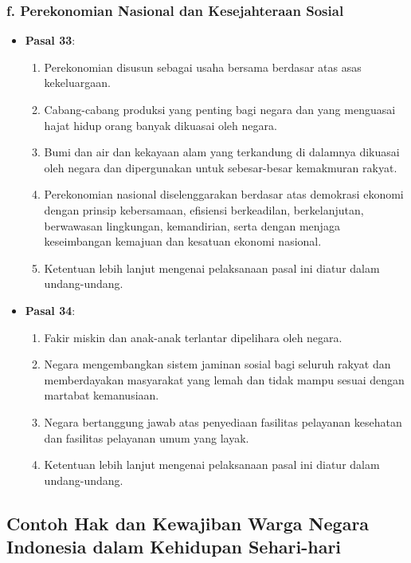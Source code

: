 \subsubsection{f. Perekonomian Nasional dan Kesejahteraan Sosial}
\begin{itemize}
    \item \textbf{Pasal 33}:
    \begin{enumerate}
        \item Perekonomian disusun sebagai usaha bersama berdasar atas asas kekeluargaan.
        \item Cabang-cabang produksi yang penting bagi negara dan yang menguasai hajat hidup orang banyak dikuasai oleh negara.
        \item Bumi dan air dan kekayaan alam yang terkandung di dalamnya dikuasai oleh negara dan dipergunakan untuk sebesar-besar kemakmuran rakyat.
        \item Perekonomian nasional diselenggarakan berdasar atas demokrasi ekonomi dengan prinsip kebersamaan, efisiensi berkeadilan, berkelanjutan, berwawasan lingkungan, kemandirian, serta dengan menjaga keseimbangan kemajuan dan kesatuan ekonomi nasional.
        \item Ketentuan lebih lanjut mengenai pelaksanaan pasal ini diatur dalam undang-undang.
    \end{enumerate}
    \item \textbf{Pasal 34}:
    \begin{enumerate}
        \item Fakir miskin dan anak-anak terlantar dipelihara oleh negara.
        \item Negara mengembangkan sistem jaminan sosial bagi seluruh rakyat dan memberdayakan masyarakat yang lemah dan tidak mampu sesuai dengan martabat kemanusiaan.
        \item Negara bertanggung jawab atas penyediaan fasilitas pelayanan kesehatan dan fasilitas pelayanan umum yang layak.
        \item Ketentuan lebih lanjut mengenai pelaksanaan pasal ini diatur dalam undang-undang.
    \end{enumerate}
\end{itemize}

\subsection{Contoh Hak dan Kewajiban Warga Negara Indonesia dalam Kehidupan Sehari-hari}

